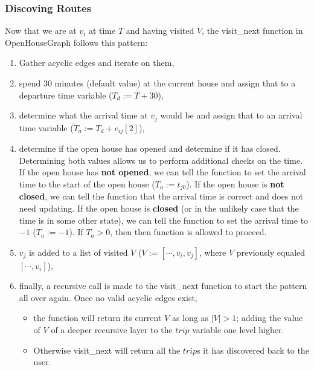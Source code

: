 \documentclass[letterpaper,11pt]{report}
\theoremstyle{definition}
\theoremstyle{definition}
\begin{document}
\subsubsection{Discoving Routes}
Now that we are at $v_i$ at time $T$ and having visited $V$, the \textsf{visit\_next} function in \textsf{OpenHouseGraph} follows this pattern:
\begin{enumerate}
  \item Gather acyclic edges and iterate on them,
  \item spend 30 minutes (default value) at the current house and assign that to a departure time variable ($T_d := T + 30$),
  \item determine what the arrival time at $v_j$ would be and assign that to an arrival time variable ($T_a := T_d + e_{ij}[2]$),
  \item determine if the open house has opened and determine if it has closed.\\
  Determining both values allows us to perform additional checks on the time. If the open house has \textbf{not opened}, we can tell the function to set the arrival time to the start of the open house ($T_a := t_{j0}$). If the open house is \textbf{not closed}, we can tell the function that the arrival time is correct and does not need updating. If the open house is \textbf{closed} (or in the unlikely case that the time is in some other state), we can tell the function to set the arrival time to $-1$ ($T_a := -1$). If $T_a > 0$, then then function is allowed to proceed.
  \item $v_j$ is added to a list of visited $V$ ($V := [\cdots , v_i, v_j]$, where $V$ previously equaled $[\cdots , v_i]$),
  \item finally, a recursive call is made to the \textsf{visit\_next} function to start the pattern all over again. Once no valid acyclic edges exist, 
    \begin{itemize}
      \item the function will return its current $V$ as long as $|V| > 1$; adding the value of $V$ of a deeper recursive layer to the $trip$ variable one level higher. 
      \item Otherwise \textsf{visit\_next} will return all the $trip$s it has discovered back to the user.
    \end{itemize}
\end{enumerate}
\end{document}
